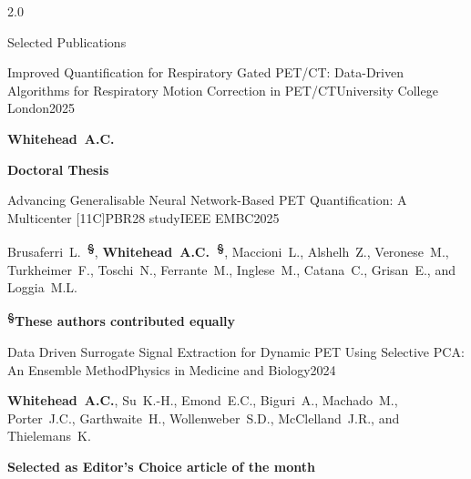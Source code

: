 \documentclass{cv}
\begin{document}
    \begin{spacing}{2.0}
        \begin{rSection}{Selected Publications}
            \vspace{-0.5cm}
            \item \begin{rSubsection}{Improved Quantification for Respiratory Gated PET/CT: Data-Driven Algorithms for Respiratory Motion Correction in PET/CT}{}{University College London}{2025}
                \vspace{-0.25cm}
                \item \textbf{Whitehead~A.C.} \\
                \vspace{-0.5cm}
                \item \textbf{Doctoral Thesis} \\
            \end{rSubsection}
            
            \vspace{-0.5cm}
            \item \begin{rSubsection}{Advancing Generalisable Neural Network-Based PET Quantification: A Multicenter [11C]PBR28 study}{}{IEEE EMBC}{2025}
                \vspace{-0.25cm}
                \item Brusaferri~L.~\textbf{\textsuperscript{\S}}, \textbf{Whitehead~A.C.~\textsuperscript{\S}}, Maccioni~L., Alshelh~Z., Veronese~M., Turkheimer~F., Toschi~N., Ferrante~M., Inglese~M., Catana~C., Grisan~E., and Loggia~M.L. \\
                \vspace{-0.5cm}
                \item \textbf{\textsuperscript{\S}These authors contributed equally} \\
            \end{rSubsection}
    
            \vspace{-0.5cm}
            \item \begin{rSubsection}{Data Driven Surrogate Signal Extraction for Dynamic PET Using Selective PCA: An Ensemble Method}{}{Physics in Medicine and Biology}{2024}
                \vspace{-0.25cm}
                \item \textbf{Whitehead~A.C.}, Su~K.-H., Emond~E.C., Biguri~A., Machado~M., Porter~J.C., Garthwaite~H., Wollenweber~S.D., McClelland~J.R., and Thielemans~K. \\
                \vspace{-0.5cm}
                \item \textbf{Selected as Editor’s Choice article of the month} \\
            \end{rSubsection}
    

\end{rSection}
\end{spacing}
\end{document}

